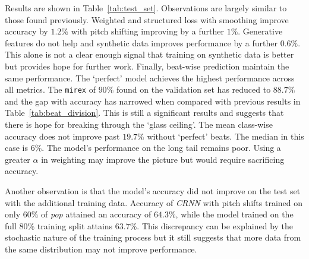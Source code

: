 Results are shown in Table~\ref{tab:test_set}. Observations are largely similar to those found previously. Weighted and structured loss with smoothing improve accuracy by $1.2\%$ with pitch shifting improving by a further $1\%$. Generative features do not help and synthetic data improves performance by a further $0.6\%$. This alone is not a clear enough signal that training on synthetic data is better but provides hope for further work. Finally, beat-wise prediction maintain the same performance. The `perfect' model achieves the highest performance across all metrics. The \texttt{mirex} of $90\%$ found on the validation set has reduced to $88.7\%$ and the gap with accuracy has narrowed when compared with previous results in Table~\ref{tab:beat_division}. This is still a significant results and suggests that there is hope for breaking through the `glass ceiling'. The mean class-wise accuracy does not improve past $19.7\%$ without `perfect' beats. The median in this case is $6\%$. The model's performance on the long tail remains poor. Using a greater $\alpha$ in weighting may improve the picture but would require sacrificing accuracy.

Another observation is that the model's accuracy did not improve on the test set with the additional training data. Accuracy of \emph{CRNN} with pitch shifts trained on only $60\%$ of \emph{pop} attained an accuracy of $64.3\%$, while the model trained on the full $80\%$ training split attains $63.7\%$. This discrepancy can be explained by the stochastic nature of the training process but it still suggests that more data from the same distribution may not improve performance. 

